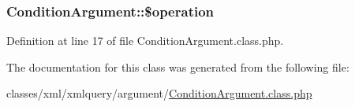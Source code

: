 \subsubsection[{\$operation}]{\setlength{\rightskip}{0pt plus 5cm}Condition\+Argument\+::\$operation}\label{classConditionArgument_acfccaada47560781bfbdf51086ce3869}


Definition at line 17 of file Condition\+Argument.\+class.\+php.



The documentation for this class was generated from the following file\+:\begin{DoxyCompactItemize}
\item 
classes/xml/xmlquery/argument/\hyperlink{ConditionArgument_8class_8php}{Condition\+Argument.\+class.\+php}\end{DoxyCompactItemize}
